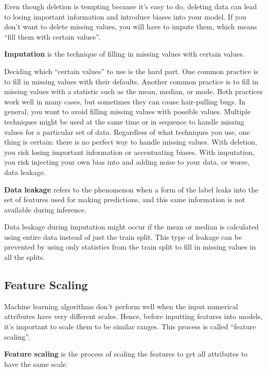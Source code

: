 Even though deletion is tempting because it's easy to do, deleting data can lead to losing important information and
introduce biases into your model. If you don't want to delete missing values, you will have to impute them, which
means ``fill them with certain values''.

\bd[Imputation]
\textbf{Imputation} is the technique of filling in missing values with certain values.
\ed

Deciding which ``certain values'' to use is the hard part. One common practice is to fill in missing values with
their defaults. Another common practice is to fill in missing values with a statistic such as the mean, median, or
mode. Both practices work well in many cases, but sometimes they can cause hair-pulling bugs. In general, you want to
avoid filling missing values with possible values. \v

Multiple techniques might be used at the same time or in sequence to handle missing values for a particular set of
data. Regardless of what techniques you use, one thing is certain: there is no perfect way to handle missing values.
With deletion, you risk losing important information or accentuating biases. With imputation, you risk injecting your
own bias into and adding noise to your data, or worse, data leakage.

\textbf{Data leakage} refers to the phenomenon when a form of the label leaks into the set of features used for making
predictions, and this same information is not available during inference.
\ed

Data leakage during imputation might occur if the mean or median is calculated using entire data instead of just the
train split. This type of leakage can be prevented by using only statistics from the train split to fill in missing
values in all the splits.

\subsection{Feature Scaling}

Machine learning algorithms don't perform well when the input numerical attributes have very different scales. Hence,
before inputting features into models, it's important to scale them to be similar ranges. This process is called
``feature scaling''.

\textbf{Feature scaling} is the process of scaling the features to get all attributes to have the same scale.
\ed

